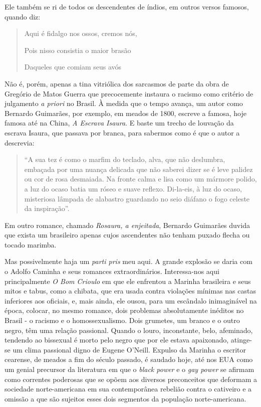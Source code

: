 \documentclass[
  letterpaper,
  DIV=11,
  numbers=noendperiod]{scrreprt}
\begin{document}
Ele também se ri de todos os descendentes de índios, em outros versos
famosos, quando diz:

\begin{quote}
Aqui é fidalgo nos ossos, cremos nós,~

Pois nisso consistia o maior brasão~

Daqueles que comiam seus avós
\end{quote}

Não é, porém, apenas a tina vitriólica dos sarcasmos de parte da obra de
Gregório de Matos Guerra que precocemente instaura o racismo como
critério de julgamento \emph{a priori} no Brasil. À medida que o tempo
avança, um autor como Bernardo Guimarães, por exemplo, em meados de
1800, escreve a famosa, hoje famosa até na China, \emph{A Escrava
Isaura}. E baste um trecho de louvação da escrava Isaura, que passava
por branca, para sabermos como é que o autor a descrevia:

\begin{quote}
``A sua tez é como o marfim do teclado, alva, que não deslumbra,
embaçada por uma nuança delicada que não saberei dizer se é leve palidez
ou cor de rosa desmaiada. Na fronte calma e lisa como um mármore polido,
a luz do ocaso batia um róseo e suave reflexo. Di-la-eis, à luz do
ocaso, misteriosa lâmpada de alabastro guardando no seio diáfano o fogo
celeste da inspiração''.
\end{quote}

Em outro romance, chamado \emph{Rosaura, a enjeitada}, Bernardo
Guimarães duvida que exista um brasileiro apenas cujos ascendentes não
tenham puxado flecha ou tocado marimba.

Mas possivelmente haja um \emph{parti pris} meu aqui. A grande explosão
se daria com o Adolfo Caminha e seus romances extraordinários.
Interessa-nos aqui principalmente \emph{O Bom Crioulo} em que ele
enfrentou a Marinha brasileira e seus mitos e tabus, como a chibata, que
era usada contra violações mínimas nas castas inferiores aos oficiais,
e, mais ainda, ele ousou, para um escândalo inimaginável na época,
colocar, no mesmo romance, dois problemas absolutamente inéditos no
Brasil - o racismo e o homossexualismo. Dois grumetes, um branco e o
outro negro, têm uma relação passional. Quando o louro, inconstante,
belo, afeminado, tendendo ao bissexual é morto pelo negro que por ele
estava apaixonado, atinge-se um clima passional digno de Eugene O'Neill.
Expulso da Marinha o escritor cearense, de meados a fim do século
passado, é saudado hoje, até nos EUA como um genial precursor da
literatura em que o \emph{black power} e o \emph{gay power} se afirmam
como correntes poderosas que se opõem aos diversos preconceitos que
deformam a sociedade norte-americana em sua contemporânea rebelião
contra o cativeiro e a omissão a que são sujeitos esses dois segmentos
da população norte-americana.
\end{document}
